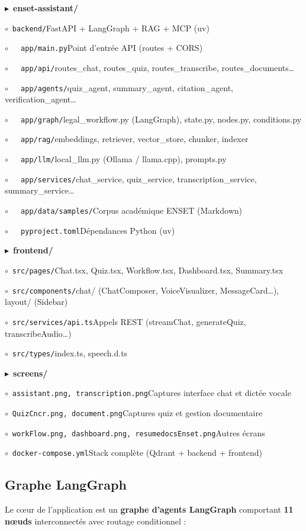\documentclass[11pt, a4paper]{article}
\newcommand{\ftdir}[1]{\textcolor{mypurple}{\sffamily\bfseries $\blacktriangleright$}\ \textbf{#1}\par\vspace{0.15em}}
\newcommand{\ftitem}[2]{\hspace{1.4em}\textcolor{draculacyan}{\texttt{$\circ$}}\ \texttt{#1}\hfill{\footnotesize\sffamily\color{gray!65}#2}\par\vspace{0.1em}}
\newenvironment{filetree}{%
  \begin{tcolorbox}[enhanced, colback=codegray, colframe=mypurple!35, arc=6pt, boxrule=0.8pt,
    left=10pt, right=10pt, top=10pt, bottom=10pt,
    fontupper=\ttfamily\footnotesize, drop fuzzy shadow=gray!20]
}{%
  \end{tcolorbox}%
}
\begin{document}
\begin{filetree}
\ftdir{enset-assistant/}
\ftitem{backend/}{FastAPI + LangGraph + RAG + MCP (uv)}
\ftitem{\ \ app/main.py}{Point d'entrée API (routes + CORS)}
\ftitem{\ \ app/api/}{routes\_chat, routes\_quiz, routes\_transcribe, routes\_documents…}
\ftitem{\ \ app/agents/}{quiz\_agent, summary\_agent, citation\_agent, verification\_agent…}
\ftitem{\ \ app/graph/}{legal\_workflow.py (LangGraph), state.py, nodes.py, conditions.py}
\ftitem{\ \ app/rag/}{embeddings, retriever, vector\_store, chunker, indexer}
\ftitem{\ \ app/llm/}{local\_llm.py (Ollama / llama.cpp), prompts.py}
\ftitem{\ \ app/services/}{chat\_service, quiz\_service, transcription\_service, summary\_service…}
\ftitem{\ \ app/data/samples/}{Corpus académique ENSET (Markdown)}
\ftitem{\ \ pyproject.toml}{Dépendances Python (uv)}
\ftdir{frontend/}
\ftitem{src/pages/}{Chat.tsx, Quiz.tsx, Workflow.tsx, Dashboard.tsx, Summary.tsx}
\ftitem{src/components/}{chat/ (ChatComposer, VoiceVisualizer, MessageCard…), layout/ (Sidebar)}
\ftitem{src/services/api.ts}{Appels REST (streamChat, generateQuiz, transcribeAudio…)}
\ftitem{src/types/}{index.ts, speech.d.ts}
\ftdir{screens/}
\ftitem{assistant.png, transcription.png}{Captures interface chat et dictée vocale}
\ftitem{QuizCncr.png, document.png}{Captures quiz et gestion documentaire}
\ftitem{workFlow.png, dashboard.png, resumedocsEnset.png}{Autres écrans}
\ftitem{docker-compose.yml}{Stack complète (Qdrant + backend + frontend)}
\end{filetree}

\subsection{Graphe LangGraph}

Le cœur de l'application est un \textbf{graphe d'agents LangGraph} comportant \textbf{11 nœuds} interconnectés avec routage conditionnel :
\end{document}
